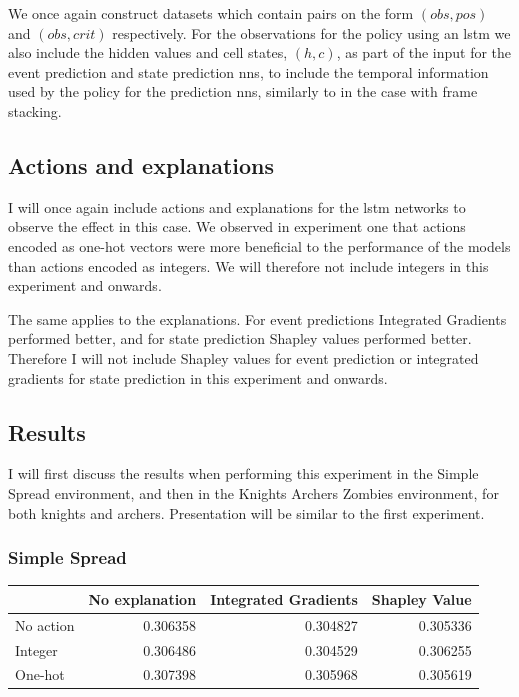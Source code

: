 \documentclass[UKenglish]{uiomasterthesis}
\begin{document}
We once again construct datasets which contain pairs on the form $(obs, pos)$ and $(obs, crit)$ respectively. For the observations for the policy using an \ac{lstm} we also include the hidden values and cell states, $(h,c)$, as part of the input for the event prediction and state prediction \acp{nn}, to include the temporal information used by the policy for the prediction \acp{nn}, similarly to in the case with frame stacking.

\subsection{Actions and explanations}
I will once again include actions and explanations for the \ac{lstm} networks to observe the effect in this case. We observed in experiment one that actions encoded as one-hot vectors were more beneficial to the performance of the models than actions encoded as integers. We will therefore not include integers in this experiment and onwards.

The same applies to the explanations. For event predictions Integrated Gradients performed better, and for state prediction Shapley values performed better. Therefore I will not include Shapley values for event prediction or integrated gradients for state prediction in this experiment and onwards.

\subsection{Results}
I will first discuss the results when performing this experiment in the Simple Spread environment, and then in the Knights Archers Zombies environment, for both knights and archers. Presentation will be similar to the first experiment.

\subsubsection{Simple Spread}

\begin{center}
\label{tab:state_simpl_lstm}
\begin{tabular}{lrrr}
\toprule
 & No explanation & Integrated Gradients & Shapley Value \\
\midrule
No action & 0.306358 & 0.304827 & 0.305336 \\
Integer & 0.306486 & 0.304529 & 0.306255 \\
One-hot & 0.307398 & 0.305968 & 0.305619 \\
\bottomrule
\end{tabular}
\end{center}
\end{document}
